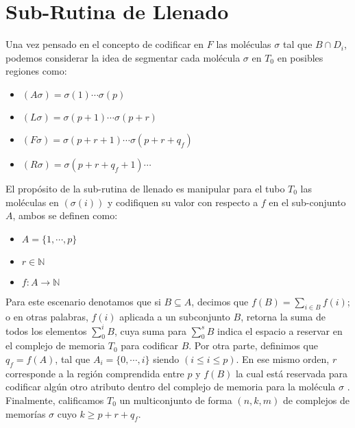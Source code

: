 \documentclass[12pt, letterpaper, twoside]{article}
\begin{document}
    \section{Sub-Rutina de Llenado}
    \par Una vez pensado en el concepto de codificar en $F$ las moléculas $\sigma$ tal que $B\cap D_i$, podemos considerar la idea de segmentar cada molécula $\sigma$ en $T_0$ en posibles regiones como:
    \begin{itemize}
        \item $(A\sigma )=\sigma (1)\cdots\sigma (p)$
        \item $(L\sigma )=\sigma (p+1)\cdots\sigma (p+r)$
        \item $(F\sigma)=\sigma(p+r+1)\cdots\sigma(p+r+q_f)$
        \item $(R\sigma)=\sigma(p+r+q_f+1)\cdots$
    \end{itemize} 
   \par El propósito de la sub-rutina de llenado es manipular para el tubo $T_0$ las moléculas en $(\sigma(i))$ y codifiquen su valor con respecto a $f$ en el sub-conjunto $A$, ambos se definen como:
   \begin{itemize}
       \item $A=\{1,\cdots,p\}$
       \item $r \in \mathbb{N}$
       \item $f:A\rightarrow\mathbb{N}$
   \end{itemize}
   \par Para este escenario denotamos que si $B\subseteq A$, decimos que  $f(B)=\sum_{i\in B}f(i)$; o en otras palabras, $f(i)$ aplicada a un subconjunto $B$, retorna la suma de todos los elementos $\sum_{0}^{i}B$, cuya suma para $\sum_{0}^{s}B$ indica el espacio a reservar en el complejo de memoria $T_0$ para codificar $B$. Por otra parte, definimos que $q_f=f(A)$, tal que $A_i=\{0,\cdots,i\}$ siendo $(i\leq i\leq p)$. En ese mismo orden, $r$ corresponde a la región comprendida entre $p$ y $f(B)$ la cual está reservada para codificar algún otro atributo dentro del complejo de memoria para la molécula $\sigma$ . Finalmente, calificamos $T_0$ un multiconjunto de forma $(n,k,m)$ de complejos de memorías $\sigma$ cuyo $k\geq p+r+q_f$.
\end{document}
